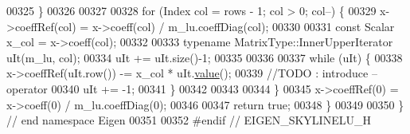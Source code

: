 \begin{DoxyCode}
00325     \}
00326 
00327 
00328     \textcolor{keywordflow}{for} (Index col = rows - 1; col > 0; col--) \{
00329         x->coeffRef(col) = x->coeff(col) / m\_lu.coeffDiag(col);
00330 
00331         \textcolor{keyword}{const} Scalar x\_col = x->coeff(col);
00332 
00333         \textcolor{keyword}{typename} MatrixType::InnerUpperIterator uIt(m\_lu, col);
00334         uIt += uIt.size()-1;
00335 
00336 
00337         \textcolor{keywordflow}{while} (uIt) \{
00338             x->coeffRef(uIt.row()) -= x\_col * uIt.\hyperlink{group___core___module_a8da735a6bfc7012606acf787156d10a0}{value}();
00339             \textcolor{comment}{//TODO : introduce --operator}
00340             uIt += -1;
00341         \}
00342 
00343 
00344     \}
00345     x->coeffRef(0) = x->coeff(0) / m\_lu.coeffDiag(0);
00346 
00347     \textcolor{keywordflow}{return} \textcolor{keyword}{true};
00348 \}
00349 
00350 \} \textcolor{comment}{// end namespace Eigen}
00351 
00352 \textcolor{preprocessor}{#endif // EIGEN\_SKYLINELU\_H}
\end{DoxyCode}
